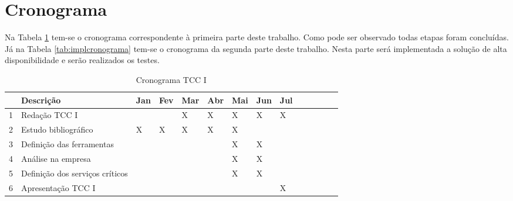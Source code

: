 

\newpage

\section{Cronograma}
\label{section:cronograma}

Na Tabela \ref{tab:propcronograma} tem-se o cronograma correspondente à primeira parte deste trabalho. Como pode ser observado todas etapas foram
concluídas.
Já na Tabela \ref{tab:implcronograma} tem-se o cronograma da segunda parte deste trabalho. Nesta parte será implementada a solução de 
alta disponibilidade e serão realizados os testes.

\begin{table}[h!]\normalsize %
\caption {Cronograma TCC I}
\label{tab:propcronograma}
\begin{center}
\def\arraystretch{1}
\setlength{\tabcolsep}{0.15cm}
\begin{tabular}{|l|l|l|l|l|l|l|l|l|l|l|l|l|l|}\hline
 & \textbf{Descrição} & \textbf{Jan} & \textbf{Fev} & \textbf{Mar} & \textbf{Abr} & \textbf{Mai} & \textbf{Jun} & \textbf{Jul} \\\hline
1 & Redação TCC I & & & X & X & X & X & X \\\hline
2 & Estudo bibliográfico & X & X & X & X & X & & \\\hline
3 & Definição das ferramentas & & & & & X & X & \\\hline
4 & Análise na empresa & & & & & X & X & \\\hline
5 & Definição dos serviços críticos & & & & & X & X & \\\hline
6 & Apresentação TCC I & & & & & & & X \\\hline
\end{tabular}
\end{center}
\end{table}

